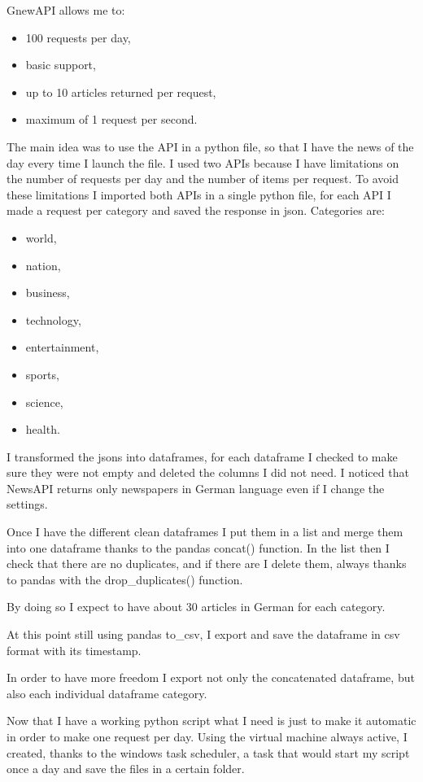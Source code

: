 GnewAPI allows me to:
\begin{itemize}
    \item 100 requests per day,
    \item basic support,
    \item up to 10 articles returned per request,
    \item maximum of 1 request per second.
\end{itemize}
The main idea was to use the API in a python file, so that I have the news of the day every time I launch the file.
I used two APIs because I have limitations on the number of requests per day and the number of items per request.
To avoid these limitations I imported both APIs in a single python file, for each API I made a request per category and saved the response in json.
Categories are:
\begin{itemize}
    \item world,
    \item nation,
    \item business,
    \item technology,
    \item entertainment,
    \item sports,
    \item science,
    \item health.
\end{itemize}

I transformed the jsons into dataframes, for each dataframe I checked to make sure they were not empty and deleted the columns I did not need.
I noticed that NewsAPI returns only newspapers in German language even if I change the settings.

Once I have the different clean dataframes I put them in a list and merge them into one dataframe thanks to the pandas concat() function.
In the list then I check that there are no duplicates, and if there are I delete them, always thanks to pandas with the drop\_duplicates() function.

By doing so I expect to have about 30 articles in German for each category.

At this point still using pandas to\_csv, I export and save the dataframe in csv format with its timestamp.

In order to have more freedom I export not only the concatenated dataframe, but also each individual dataframe category.

Now that I have a working python script what I need is just to make it automatic in order to make one request per day.
Using the virtual machine always active, I created, thanks to the windows task scheduler, a task that would start my script once a day and save the files in a certain folder.

